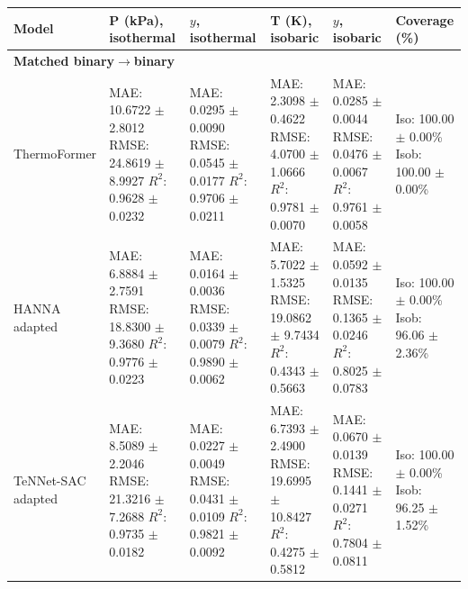 \begin{tabular}{llllll}
Model & P (kPa), isothermal & $y$, isothermal & T (K), isobaric & $y$, isobaric & Coverage (\%) \\
\hline
\multicolumn{6}{l}{\textbf{Matched binary$\to$binary}} \\
ThermoFormer & \shortstack[l]{MAE: 10.6722 $\pm$ 2.8012 \\ RMSE: 24.8619 $\pm$ 8.9927 \\ $R^2$: 0.9628 $\pm$ 0.0232} & \shortstack[l]{MAE: 0.0295 $\pm$ 0.0090 \\ RMSE: 0.0545 $\pm$ 0.0177 \\ $R^2$: 0.9706 $\pm$ 0.0211} & \shortstack[l]{MAE: 2.3098 $\pm$ 0.4622 \\ RMSE: 4.0700 $\pm$ 1.0666 \\ $R^2$: 0.9781 $\pm$ 0.0070} & \shortstack[l]{MAE: 0.0285 $\pm$ 0.0044 \\ RMSE: 0.0476 $\pm$ 0.0067 \\ $R^2$: 0.9761 $\pm$ 0.0058} & \shortstack[l]{Iso: 100.00 $\pm$ 0.00\% \\ Isob: 100.00 $\pm$ 0.00\%} \\
HANNA adapted & \shortstack[l]{MAE: 6.8884 $\pm$ 2.7591 \\ RMSE: 18.8300 $\pm$ 9.3680 \\ $R^2$: 0.9776 $\pm$ 0.0223} & \shortstack[l]{MAE: 0.0164 $\pm$ 0.0036 \\ RMSE: 0.0339 $\pm$ 0.0079 \\ $R^2$: 0.9890 $\pm$ 0.0062} & \shortstack[l]{MAE: 5.7022 $\pm$ 1.5325 \\ RMSE: 19.0862 $\pm$ 9.7434 \\ $R^2$: 0.4343 $\pm$ 0.5663} & \shortstack[l]{MAE: 0.0592 $\pm$ 0.0135 \\ RMSE: 0.1365 $\pm$ 0.0246 \\ $R^2$: 0.8025 $\pm$ 0.0783} & \shortstack[l]{Iso: 100.00 $\pm$ 0.00\% \\ Isob: 96.06 $\pm$ 2.36\%} \\
TeNNet-SAC adapted & \shortstack[l]{MAE: 8.5089 $\pm$ 2.2046 \\ RMSE: 21.3216 $\pm$ 7.2688 \\ $R^2$: 0.9735 $\pm$ 0.0182} & \shortstack[l]{MAE: 0.0227 $\pm$ 0.0049 \\ RMSE: 0.0431 $\pm$ 0.0109 \\ $R^2$: 0.9821 $\pm$ 0.0092} & \shortstack[l]{MAE: 6.7393 $\pm$ 2.4900 \\ RMSE: 19.6995 $\pm$ 10.8427 \\ $R^2$: 0.4275 $\pm$ 0.5812} & \shortstack[l]{MAE: 0.0670 $\pm$ 0.0139 \\ RMSE: 0.1441 $\pm$ 0.0271 \\ $R^2$: 0.7804 $\pm$ 0.0811} & \shortstack[l]{Iso: 100.00 $\pm$ 0.00\% \\ Isob: 96.25 $\pm$ 1.52\%} \\

\end{tabular}
